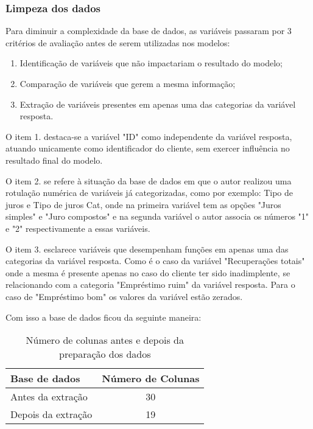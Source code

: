 \subsubsection{Limpeza dos dados}

Para diminuir a complexidade da base de dados, as variáveis passaram por 3 critérios de avaliação antes de serem utilizadas
nos modelos:

\begin{enumerate}
  \item Identificação de variáveis que não impactariam o resultado do modelo;
  \item Comparação de variáveis que gerem a mesma informação;
  \item Extração de variáveis presentes em apenas uma das categorias da variável resposta.
\end{enumerate}

O item 1. destaca-se a variável "ID" como independente da variável resposta, 
atuando unicamente como identificador do cliente, sem exercer influência no resultado final do modelo.

O item 2. se refere à situação da base de dados em que o autor realizou uma rotulação numérica de variáveis 
já categorizadas, como por exemplo: 
Tipo de juros e Tipo de juros Cat, onde na primeira variável tem as opções "Juros simples" e "Juro compostos" e na segunda variável
o autor associa os números "1" e "2" respectivamente a essas variáveis.

O item 3. esclarece variáveis que desempenham funções em apenas uma das categorias da variável resposta. Como é o caso da 
variável "Recuperações totais" onde a mesma é presente apenas no caso do cliente ter sido inadimplente, se relacionando
com a categoria "Empréstimo ruim" da variável resposta. Para o caso de "Empréstimo bom" os valores da variável estão zerados.

Com isso a base de dados ficou da seguinte maneira:

\begin{table}[h]
  \centering
  \begin{tabular}{l|c}
  \hline
  \textbf{Base de dados} & \textbf{Número de Colunas} \\ \hline
  Antes da extração & 30 \\ 
  Depois da extração & 19 \\ \hline
  \end{tabular}
  \caption{Número de colunas antes e depois da preparação dos dados}
  \label{table:columns_before_after}
\end{table}

